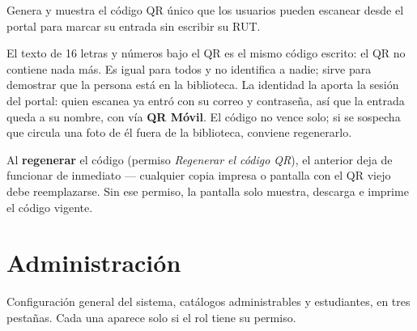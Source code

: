 \documentclass[11pt,a4paper]{report}
\begin{document}
Genera y muestra el código QR único que los usuarios pueden escanear
desde el portal para marcar su entrada sin escribir su RUT.


El texto de 16 letras y números bajo el QR es el mismo código escrito: el
QR no contiene nada más. Es igual para todos y no identifica a nadie;
sirve para demostrar que la persona está en la biblioteca. La identidad
la aporta la sesión del portal: quien escanea ya entró con su correo y
contraseña, así que la entrada queda a su nombre, con vía \textbf{QR
Móvil}. El código no vence solo; si se sospecha que circula una foto de
él fuera de la biblioteca, conviene regenerarlo.

\begin{importante}
Al \textbf{regenerar} el código (permiso \textit{Regenerar el código
QR}), el anterior deja de funcionar de inmediato --- cualquier copia
impresa o pantalla con el QR viejo debe reemplazarse. Sin ese permiso, la
pantalla solo muestra, descarga e imprime el código vigente.
\end{importante}

\section{Administración}
\label{sec:administracion}

Configuración general del sistema, catálogos administrables y estudiantes,
en tres pestañas. Cada una aparece solo si el rol tiene su permiso.

\end{document}
